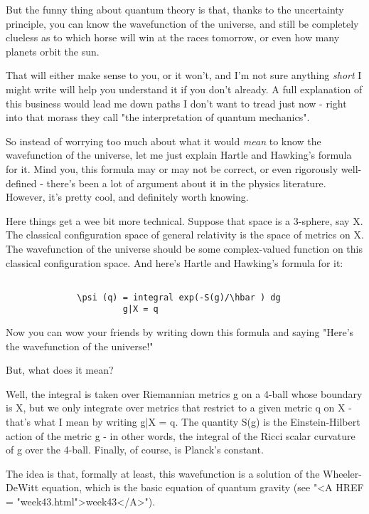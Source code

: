 But the funny thing about quantum theory is that, thanks to the
uncertainty principle, you can know the wavefunction of the universe,
and still be completely clueless as to which horse will win at the
races tomorrow, or even how many planets orbit the sun.  

That will either make sense to you, or it won't, and I'm not sure
anything \emph{short} I might write will help you understand it if you 
don't already.  A full explanation of this business would lead me 
down paths I don't want to tread just now - right into that morass
they call "the interpretation of quantum mechanics".

So instead of worrying too much about what it would \emph{mean} to know the
wavefunction of the universe, let me just explain Hartle and Hawking's
formula for it.  Mind you, this formula may or may not be correct, or 
even rigorously well-defined - there's been a lot of argument about it 
in the physics literature.  However, it's pretty cool, and definitely
worth knowing. 

Here things get a wee bit more technical.  Suppose that space is a 
3-sphere, say X.  The classical configuration space of general relativity 
is the space of metrics on X.  The wavefunction of the universe should 
be some complex-valued function on this classical configuration space.  
And here's Hartle and Hawking's formula for it:


\begin{verbatim}

              \psi (q) = integral exp(-S(g)/\hbar ) dg
                       g|X = q

\end{verbatim}
    
Now you can wow your friends by writing down this formula and
saying "Here's the wavefunction of the universe!"  

But, what does it mean? 

Well, the integral is taken over Riemannian metrics g on a 4-ball
whose boundary is X, but we only integrate over metrics that
restrict to a given metric q on X - that's what I mean by writing
g|X = q.  The quantity S(g) is the Einstein-Hilbert action of the 
metric g - in other words, the integral of the Ricci scalar curvature
of g over the 4-ball.  Finally, of course, \hbar  is Planck's constant.

The idea is that, formally at least, this wavefunction is a solution of
the Wheeler-DeWitt equation, which is the basic equation of quantum
gravity (see "<A HREF = "week43.html">week43</A>").


